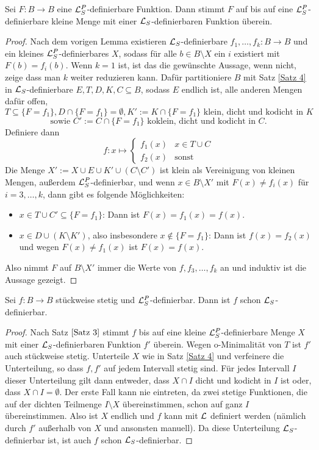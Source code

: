 \begin{theorem}\label{Satz 3}
	Sei $F:B\rightarrow B$ eine $\mathcal{L}^P_S$-definierbare Funktion. Dann stimmt $F$ auf bis auf eine $\mathcal{L}^P_S$-definierbare kleine Menge mit einer $\mathcal{L}_S$-definierbaren Funktion überein.
\end{theorem}
\begin{proof}
	Nach dem vorigen Lemma existieren $\mathcal{L}_S$-definierbare $f_1,\dots,f_k:B\rightarrow B$ und ein kleines $\mathcal{L}^P_S$-definierbares $X$, sodass für alle $b\in B\setminus X$ ein $i$ existiert mit $F(b)=f_i(b)$. Wenn $k=1$ ist, ist das die gewünschte Aussage, wenn nicht, zeige dass man $k$ weiter reduzieren kann. Dafür partitioniere $B$ mit Satz \ref{Satz 4} in $\mathcal{L}_S$-definierbare $E,T,D,K,C\subseteq B$, sodass $E$ endlich ist, alle anderen Mengen dafür offen, 
	$$T\subseteq\{F=f_1\}, D\cap\{F=f_1\}=\emptyset,K':=K\cap\{F=f_1\}\text{ klein, dicht und kodicht in }K$$ $$\text{sowie }C':=C\cap\{F=f_1\}\text{ koklein, dicht und kodicht in }C.$$
	Definiere dann $$f:x\mapsto\left\{\begin{array}{ll}
	f_1(x)&x\in T\cup C\\
	f_2(x)&\text{sonst}
	\end{array}\right.$$
	Die Menge $X':=X\cup E\cup K'\cup (C\setminus C')$ ist klein als Vereinigung von kleinen Mengen, außerdem $\mathcal{L}^P_S$-definierbar, und wenn $x\in B\setminus X'$ mit $F(x)\neq f_i(x)$ für $i=3,\dots,k$, dann gibt es folgende Möglichkeiten:
	\begin{itemize}
		\item $x\in T\cup C'\subseteq\{F=f_1\}$: Dann ist $F(x)=f_1(x)=f(x)$.
		\item $x\in D\cup(K\setminus K')$, also insbesondere $x\notin\{F=f_1\}$: Dann ist $f(x)=f_2(x)$ und wegen $F(x)\neq f_1(x)$ ist $F(x)=f(x)$.
	\end{itemize}
    Also nimmt $F$ auf $B\setminus X'$ immer die Werte von $f,f_3,\dots,f_k$ an und induktiv ist die Aussage gezeigt.
\end{proof}

\begin{lemma}\label{Stückweise stetige Abbildungen}
	Sei $f:B\rightarrow B$ stückweise stetig und $\mathcal{L}^P_S$-definierbar. Dann ist $f$ schon $\mathcal{L}_S$-definierbar.
\end{lemma}
\begin{proof}
	Nach Satz $\ref{Satz 3}$ stimmt $f$ bis auf eine kleine $\mathcal{L}^P_S$-definierbare Menge $X$ mit einer $\mathcal{L}_S$-definierbaren Funktion $f'$ überein. Wegen o-Minimalität von $T$ ist $f'$ auch stückweise stetig. Unterteile $X$ wie in Satz \ref{Satz 4} und verfeinere die Unterteilung, so dass $f,f'$ auf jedem Intervall stetig sind. Für jedes Intervall $I$ dieser Unterteilung gilt dann entweder, dass $X\cap I$ dicht und kodicht in $I$ ist oder, dass $X\cap I=\emptyset$. Der erste Fall kann nie eintreten, da zwei stetige Funktionen, die auf der dichten Teilmenge $I\setminus X$ übereinstimmen, schon auf ganz $I$ übereinstimmen. Also ist $X$ endlich und $f$ kann mit $\mathcal{L}$ definiert werden (nämlich durch $f'$ außerhalb von $X$ und ansonsten manuell). Da diese Unterteilung $\mathcal{L}_S$-definierbar ist, ist auch $f$ schon $\mathcal{L}_S$-definierbar.
\end{proof}

